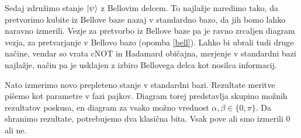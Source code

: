 \documentclass[mat1]{fmfdelo}
\begin{document}
Sedaj združimo stanje \(\ket{\psi}\) z Bellovim delcem. To najlažje naredimo tako, da pretvorimo kubite iz Bellove baze nazaj v standardno bazo, da jih bomo lahko naravno izmerili. Vezje za pretvorbo iz Bellove baze pa je ravno zrcaljen diagram vezja, za pretvarjanje v Bellovo bazo (opomba \ref{bell}). Lahko bi ubrali tudi druge načine, vendar so vrata \textsf{cNOT} in Hadamard običajna, merjenje v standardni bazi najlažje, način pa je usklajen z izbiro Bellovega delca kot nosilca informacij.
\begin{center}
\end{center}
Nato izmerimo novo prepleteno stanje v standardni bazi. Rezultate meritve pišemo kot parametre v fazi pajkov. Diagram torej predstavlja skupino možnih rezultatov poskusa, en diagram za vsako možno vrednost \(\alpha,\beta\in\{0,\pi\}\). Da shranimo rezultate, potrebujemo dva klasična bita. Vsak pove ali smo izmerili \(0\) ali ne.
\end{document}
